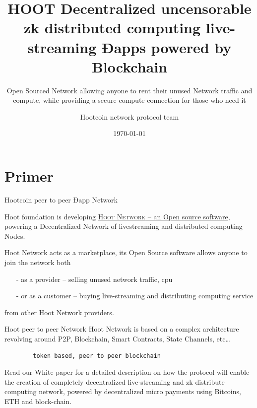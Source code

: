 \documentclass[10pt]{beamer}
\title{HOOT Decentralized uncensorable zk distributed computing live-streaming Ðapps powered by Blockchain}
\subtitle{Open Sourced Network allowing anyone to rent their unused Network traffic and compute, while providing a secure compute connection for those who need it}
\date{\today}
\author{Hootcoin network protocol team}
\institute{Hootcoin Foundation}
\newcommand{\themename}{\textbf{\textsc{metropolis}}\xspace}
\begin{document}
\maketitle


\section{Primer}

\begin{frame}[fragile]{Hootcoin peer to peer Ðapp Network }

  Hoot foundation is developing \href{https://onhoot.com/tokensale}{\textsc{Hoot Network} – an Open source software}, powering a Decentralized Network of livestreaming and distributed computing Nodes.
  

Hoot Network acts as a marketplace, its Open Source software allows anyone to join the network both 

\begin{itemize}
\item[-]as a provider – selling unused network traffic, cpu
\item[-]or as a customer – buying live-streaming and distributing computing service
\end{itemize}
 from other Hoot Network providers. 
\end{frame}
\begin{frame}[fragile]{Hoot peer to peer Network }
  Hoot Network is based on a complex architecture revolving around   P2P, Blockchain, Smart Contracts, State Channels, etc\ldots
    \begin{verbatim}  
        token based, peer to peer blockchain 
  \end{verbatim}
  
   Read our White paper for a detailed description on how the protocol will enable the creation of completely decentralized live-streaming and zk distribute computing network, powered by decentralized micro payments using Bitcoins, ETH and block-chain. 


\end{frame}
\end{document}
